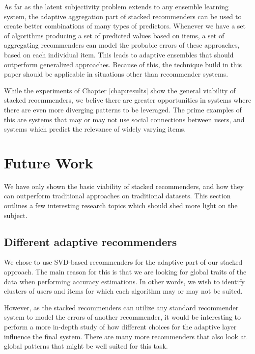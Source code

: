 As far as the latent subjectivity problem extends to any ensemble learning system,
the adaptive aggregation part of stacked recommenders can be used to 
create better combinations of many types of predictors.
Whenever we have a set of algorithms producing a set of predicted values
based on items, a set of aggregating recommenders can model the probable
errors of these approaches, based on each individual item.
This leads to adaptive ensembles that should outperform generalized approaches.
Because of this, the technique build in this paper should be 
applicable in situations other than recommender systems.

While the experiments of Chapter \ref{chap:results} show the general viability of stacked reocmmenders,
we belive there are greater opportunities in systems where there  are even more diverging
patterns to be leveraged. The prime examples of this are systems that may or may 
not use social connections between users, and systems which predict the 
relevance of widely varying items.


\section{Future Work}      

We have only shown the basic viability of stacked recommenders,
and how they can outperform traditional approaches on traditional datasets.
This section outlines a few interesting research topics
which should shed more light on the subject.

\subsection{Different adaptive recommenders}

We chose to use SVD-based recommenders for the adaptive part of our stacked approach.
The main reason for this is that we are looking for global traits of the data
when performing accuracy estimations. In other words, we wish to identify
clusters of users and items for which each algorithm may or may not be suited.

However, as the stacked recommenders can utilize any standard recommender system
to model the errors of another recommender, it would be interesting to perform
a more in-depth study of how different choices for the adaptive layer
influence the final system.
There are many more recommenders that also look at global patterns
that might be well suited for this task.


